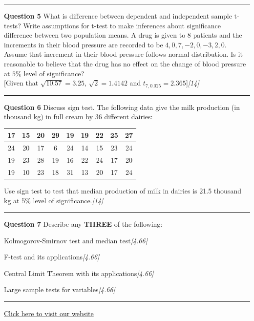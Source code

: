 \documentclass[11pt,a4paper]{article}
\newcommand{\pts}[1]{\hfill   \textit{[#1]}}
\begin{document}
\medskip\rule{\linewidth}{0.2pt}\medskip




\noindent   \textbf{Question 5}
What is difference between dependent and independent sample t-tests? Write assumptions for t-test to make inferences about significance difference between two population means. A drug is given to 8 patients and the increments in their blood pressure are recorded to be $4, 0, 7, -2, 0, -3, 2, 0$. Assume that increment in their blood pressure follows normal distribution. Is it reasonable to believe that the drug has no effect on the change of blood pressure at $5\%$ level of significance? \\
{[Given that $\sqrt{10.57} = 3.25$, $\sqrt{2} = 1.4142$ and $t_{7, 0.025} = 2.365$]}\pts{14}

\medskip\rule{\linewidth}{0.2pt}\medskip




\noindent   \textbf{Question 6}
Discuss sign test. The following data give the milk production (in thousand kg) in full cream by 36 different dairies:

\begin{center}

\begin{tabular}{|c|c|c|c|c|c|c|c|c|}
  \hline
  17 & 15 & 20 & 29 & 19 & 19 & 22 & 25 & 27 \\ \hline
  24 & 20 & 17 & 6 & 24 & 14 & 15 & 23 & 24 \\ \hline
  19 & 23 & 28 & 19 & 16 & 22 & 24 & 17 & 20 \\ \hline
  19 & 10 & 23 & 18 & 31 & 13 & 20 & 17 & 24 \\ \hline
\end{tabular}
\end{center}
Use sign test to test that median production of milk in dairies is 21.5 thousand kg at 5\% level of significance.\pts{14}

\medskip\rule{\linewidth}{0.2pt}\medskip




\noindent   \textbf{Question 7}
Describe any   \textbf{THREE} of the following:

\begin{parts}
  \item Kolmogorov-Smirnov test and median test\pts{4.66}
  \item F-test and its applications\pts{4.66}
  \item Central Limit Theorem with its applications\pts{4.66}
  \item Large sample tests for variables\pts{4.66}
\end{parts}

\vfill\rule{\linewidth}{0.4pt}

\begin{center}\small\href{https://bhu-exam.vercel.app/}{Click here to visit our website}\end{center}
\end{document}
